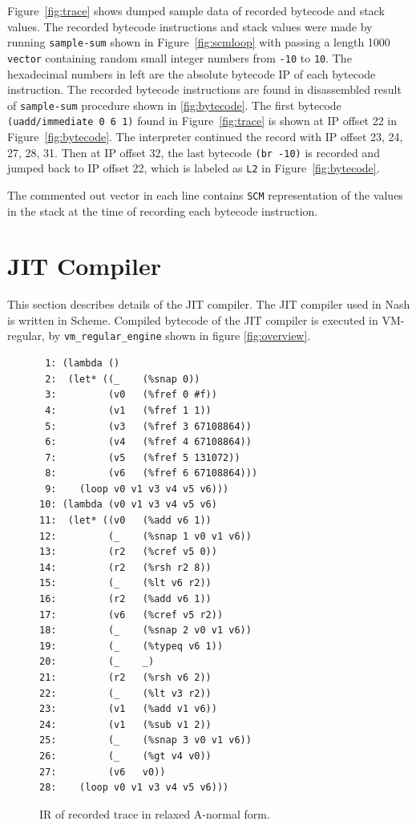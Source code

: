 \documentclass[preprint, numbers]{sigplanconf}
\begin{document}
Figure~\hyperref[fig:trace]{\ref{fig:trace}} shows dumped sample data of
recorded bytecode and stack values. The recorded bytecode instructions and
stack values were made by running \texttt{sample-sum} shown in
Figure~\hyperref[fig:scmloop]{\ref{fig:scmloop}} with passing a length 1000
\texttt{vector} containing random small integer numbers from \texttt{-10} to
\texttt{10}. The hexadecimal numbers in left are the absolute bytecode IP of
each bytecode instruction. The recorded bytecode instructions are found in
disassembled result of \texttt{sample-sum} procedure shown in
\hyperref[fig:bytecode]{\ref{fig:bytecode}}. The first bytecode
\texttt{(uadd/immediate 0 6 1)} found in
Figure~\hyperref[fig:trace]{\ref{fig:trace}} is shown at IP offset 22 in
Figure~\hyperref[fig:bytecode]{\ref{fig:bytecode}}. The interpreter continued
the record with IP offset 23, 24, 27, 28, 31. Then at IP offset 32, the last
bytecode \texttt{(br -10)} is recorded and jumped back to IP offset 22, which
is labeled as \texttt{L2} in
Figure~\hyperref[fig:bytecode]{\ref{fig:bytecode}}.

The commented out vector in each line contains \texttt{SCM} representation of
the values in the stack at the time of recording each bytecode instruction.


\section{JIT Compiler}
\label{sec:compiler}

This section describes details of the JIT compiler. The JIT compiler used in
Nash is written in Scheme. Compiled bytecode of the JIT compiler is executed
in VM-regular, by \texttt{vm\_regular\_engine} shown in figure
\hyperref[fig:overview]{\ref{fig:overview}}.

\begin{figure}
\begin{verbatim}
 1: (lambda ()
 2:  (let* ((_    (%snap 0))
 3:         (v0   (%fref 0 #f))
 4:         (v1   (%fref 1 1))
 5:         (v3   (%fref 3 67108864))
 6:         (v4   (%fref 4 67108864))
 7:         (v5   (%fref 5 131072))
 8:         (v6   (%fref 6 67108864)))
 9:    (loop v0 v1 v3 v4 v5 v6)))
10: (lambda (v0 v1 v3 v4 v5 v6)
11:  (let* ((v0   (%add v6 1))
12:         (_    (%snap 1 v0 v1 v6))
13:         (r2   (%cref v5 0))
14:         (r2   (%rsh r2 8))
15:         (_    (%lt v6 r2))
16:         (r2   (%add v6 1))
17:         (v6   (%cref v5 r2))
18:         (_    (%snap 2 v0 v1 v6))
19:         (_    (%typeq v6 1))
20:         (_    _)
21:         (r2   (%rsh v6 2))
22:         (_    (%lt v3 r2))
23:         (v1   (%add v1 v6))
24:         (v1   (%sub v1 2))
25:         (_    (%snap 3 v0 v1 v6))
26:         (_    (%gt v4 v0))
27:         (v6   v0))
28:    (loop v0 v1 v3 v4 v5 v6)))
\end{verbatim}
\caption{IR of recorded trace in relaxed A-normal form.}
\label{fig:anf}
\end{figure}
\end{document}

